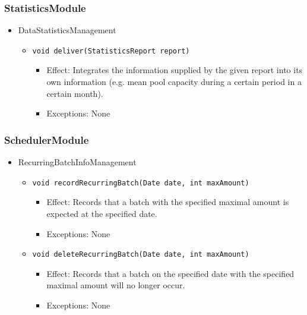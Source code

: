 \documentclass[a4paper,10pt]{article}
\begin{document}
\subsubsection*{StatisticsModule}
\begin{itemize}
	\item DataStatisticsManagement
	\begin{itemize}
		\item \texttt{void deliver(StatisticsReport report)}
		\begin{itemize}
			\item Effect: Integrates the information supplied by the given report into its own information (e.g. mean pool capacity during a certain period in a certain month).
			\item Exceptions: None
		\end{itemize}
	\end{itemize}
\end{itemize}

\subsubsection*{SchedulerModule}
\begin{itemize}
	\item RecurringBatchInfoManagement
	\begin{itemize}
		\item \texttt{void recordRecurringBatch(Date date, int maxAmount)}
		\begin{itemize}
			\item Effect: Records that a batch with the specified maximal amount is expected at the specified date.
			\item Exceptions: None
		\end{itemize}
		
		\item \texttt{void deleteRecurringBatch(Date date, int maxAmount)}
		\begin{itemize}
			\item Effect: Records that a batch on the specified date with the specified maximal amount will no longer occur.
			\item Exceptions: None
		\end{itemize}
	\end{itemize}
\end{itemize}
\end{document}
